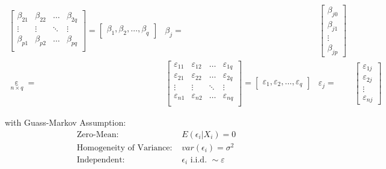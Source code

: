 \begin{subequations}
\begin{align}
\begin{bmatrix}
        \beta _{21}&\beta _{22}&\ldots&\beta _{2q}\\
        \vdots&\vdots&\ddots&\vdots\\
        \beta _{p1}&\beta _{p2}&\ldots&\beta _{pq}\\
        \end{bmatrix} =\begin{bmatrix}
            \beta _1,\beta _2,\ldots,\beta _q
        \end{bmatrix}
        & \beta _j=&\begin{bmatrix}
            \beta _{j0}\\
            \beta_{j1}\\
            \vdots\\
            \beta_{jp}
        \end{bmatrix}\\
        \mathop{\varepsilon }\limits_{n\times q} =&
        \begin{bmatrix}
        \varepsilon _{11}&\varepsilon _{12}&\ldots&\varepsilon _{1q}\\
        \varepsilon _{21}&\varepsilon _{22}&\ldots&\varepsilon _{2q}\\
        \vdots&\vdots&\ddots&\vdots\\
        \varepsilon _{n1}&\varepsilon _{n2}&\ldots&\varepsilon _{nq}\\
        \end{bmatrix}=
        \begin{bmatrix}
            \varepsilon _1,\varepsilon _2,\ldots,\varepsilon _q
        \end{bmatrix}
        &
        \varepsilon _j=&\begin{bmatrix}
                \varepsilon _{1j}\\
                \varepsilon _{2j}\\
                \vdots\\
                \varepsilon _{nj}
            \end{bmatrix}
    \end{align}
\end{subequations}

with Guass-Markov Assumption:
\begin{equation}\label{EqaGaussMarkovAssumption}
    \begin{aligned}
        \text{Zero-Mean: }&E(\epsilon_i|X_i)=0 \\
        \text{Homogeneity of Variance: }&var(\epsilon_i)=\sigma^2\\
        \text{Independent: }&\epsilon_i\text{ i.i.d. }\sim \varepsilon
    \end{aligned}
\end{equation}

